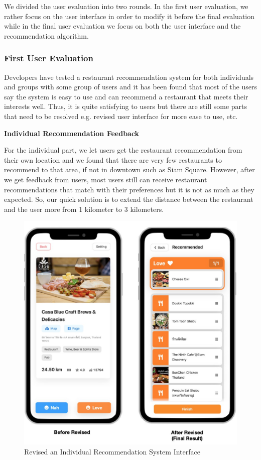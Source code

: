 \documentclass[12pt,oneside,openright,a4paper]{cpe-english-project}
\begin{document}
We divided the user evaluation into two rounds. In the first user evaluation, we rather focus on the user interface in order to modify it before the final evaluation while in the final user evaluation we focus on both the user interface and the recommendation algorithm.

\subsubsection{First User Evaluation}

Developers have tested a restaurant recommendation system for both individuals and groups with some group of users and it has been found that most of the users say the system is easy to use and can recommend a restaurant that meets their interests well. Thus, it is quite satisfying to users but there are still some parts that need to be resolved e.g. revised user interface for more ease to use, etc.

\textbf{Individual Recommendation Feedback}\par

For the individual part, we let users get the restaurant recommendation from their own location and we found that there are very few restaurants to recommend to that area, if not in downtown such as Siam Square. However, after we get feedback from users, most users still can receive restaurant recommendations that match with their preferences but it is not as much as they expected. So, our quick solution is to extend the distance between the restaurant and the user more from 1 kilometer to 3 kilometers.

\begin{figure}[H]\centering
\includegraphics[width=350pt]{./images/4usereva1.jpg}
\caption{Revised an Individual Recommendation System Interface}
\label{fig:4usereva_1}
\end{figure}\vspace{-24pt}
\end{document}
